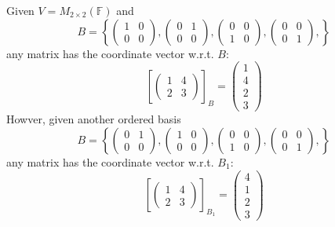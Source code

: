 \begin{example}
Given $V=M_{2\times 2}(\mathbb{F})$ and
\[
B=
\left\{
\begin{pmatrix}
1&0\\0&0
\end{pmatrix},
\begin{pmatrix}
0&1\\0&0
\end{pmatrix},
\begin{pmatrix}
0&0\\1&0
\end{pmatrix},
\begin{pmatrix}
0&0\\0&1
\end{pmatrix},
\right\}
\]
any matrix has the coordinate vector w.r.t. $B$:
\[
\left[
\begin{pmatrix}
1&4\\2&3
\end{pmatrix}
\right]_B
=
\begin{pmatrix}
1\\4\\2\\3
\end{pmatrix}
\]
Howver, given another ordered basis
\[
B=
\left\{
\begin{pmatrix}
0&1\\0&0
\end{pmatrix},
\begin{pmatrix}
1&0\\0&0
\end{pmatrix},
\begin{pmatrix}
0&0\\1&0
\end{pmatrix},
\begin{pmatrix}
0&0\\0&1
\end{pmatrix},
\right\}
\]
any matrix has the coordinate vector w.r.t. $B_1$:
\[
\left[
\begin{pmatrix}
1&4\\2&3
\end{pmatrix}
\right]_{B_1}
=
\begin{pmatrix}
4\\1\\2\\3
\end{pmatrix}
\]
\end{example}


